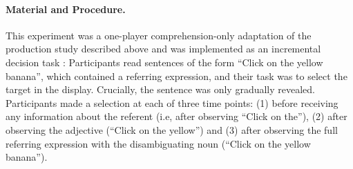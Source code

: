\documentclass[10pt,letterpaper]{article}
\begin{document}



\paragraph{Material and Procedure.} This experiment was a one-player comprehension-only adaptation of the production study described above and was implemented as an incremental decision task \cite{Qing:2018}: Participants read sentences of the form ``Click on the yellow banana'', which contained a referring expression, and their task was to select the target in the display. Crucially, the sentence was only gradually revealed.  Participants made a selection at each of three time points: (1) before receiving any information about the referent (i.e, after observing ``Click on the''), (2) after observing the adjective (``Click on the yellow'') and (3) after observing the full referring expression with the disambiguating noun (``Click on the yellow banana''). 
\end{document}
